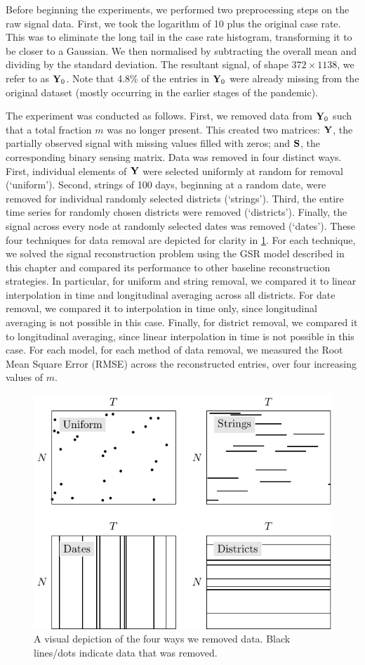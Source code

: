 Before beginning the experiments, we performed two preprocessing steps on the raw signal data. First, we took the logarithm of 10 plus the original case rate. This was to eliminate the long tail in the case rate histogram, transforming it to be closer to a Gaussian. We then normalised by subtracting the overall mean and dividing by the standard deviation. The resultant signal, of shape $372 \times 1138$, we refer to as $\mathbf{Y}_0$. Note that 4.8\% of the entries in $\mathbf{Y}_0$ were already missing from the original dataset (mostly occurring in the earlier stages of the pandemic).

The experiment was conducted as follows. First, we removed data from $\mathbf{Y}_0$ such that a total fraction $m$ was no longer present. This created two matrices: $\mathbf{Y}$, the partially observed signal with missing values filled with zeros; and $\mathbf{S}$, the corresponding binary sensing matrix. Data was removed in four distinct ways. First, individual elements of $\mathbf{Y}$ were selected uniformly at random for removal (`uniform'). Second, strings of 100 days, beginning at a random date, were removed for individual randomly selected districts (`strings'). Third, the entire time series for randomly chosen districts were removed (`districts'). Finally, the signal across every node at randomly selected dates was removed (`dates'). These four techniques for data removal are depicted for clarity in \cref{fig:missing_data}. For each technique, we solved the signal reconstruction problem using the GSR model described in this chapter and compared its performance to other baseline reconstruction strategies. In particular, for uniform and string removal, we compared it to linear interpolation in time and longitudinal averaging across all districts. For date removal, we compared it to interpolation in time only, since longitudinal averaging is not possible in this case. Finally, for district removal, we compared it to longitudinal averaging, since linear interpolation in time is not possible in this case. For each model, for each method of data removal, we measured the Root Mean Square Error (RMSE) across the reconstructed entries, over four increasing values of $m$. 


\begin{figure}[t]
    \begin{center}
        \includegraphics[width=0.6\linewidth]{Figures/missing.pdf}
    \end{center}
    \caption{\small{A visual depiction of the four ways we removed data. Black lines/dots indicate data that was removed. }}
    \label{fig:missing_data}
\end{figure}


